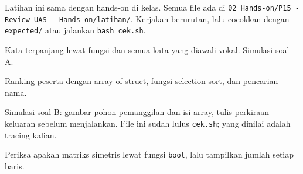 \documentclass[a4paper]{article}
\begin{document}
Latihan ini sama dengan hands-on di kelas. Semua file ada di \texttt{02 Hands-on/P15 - Review UAS - Hands-on/latihan/}. Kerjakan berurutan, lalu cocokkan dengan \texttt{expected/} atau jalankan \texttt{bash cek.sh}.
\par\vspace{4pt}\par\vspace{6pt}
Kata terpanjang lewat fungsi dan semua kata yang diawali vokal. Simulasi soal A.

Ranking peserta dengan array of struct, fungsi selection sort, dan pencarian nama.

Simulasi soal B: gambar pohon pemanggilan dan isi array, tulis perkiraan keluaran sebelum menjalankan. File ini sudah lulus \texttt{cek.sh}; yang dinilai adalah tracing kalian.

Periksa apakah matriks simetris lewat fungsi \texttt{bool}, lalu tampilkan jumlah setiap baris.
\end{document}
